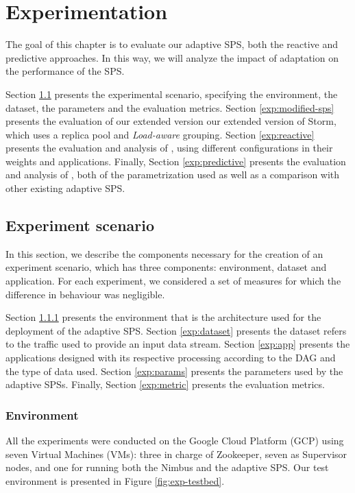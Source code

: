 \chapter{Experimentation}
\label{experimentation}
The goal of this chapter is to evaluate our adaptive SPS, both the reactive and predictive approaches. In this way, we will analyze the impact of adaptation on the performance of the SPS. %

Section \ref{exp:scenario} presents the experimental scenario, specifying the environment, the dataset, the parameters and the evaluation metrics. Section \ref{exp:modified-sps} presents the evaluation of our extended version our extended version of Storm, which uses a replica pool and \textit{Load-aware} grouping. Section \ref{exp:reactive} presents the evaluation and analysis of \rSPS{}, using different configurations in their weights and applications. Finally, Section \ref{exp:predictive} presents the evaluation and analysis of \pSPS{}, both of the parametrization used as well as a comparison with other existing adaptive SPS.

\section{Experiment scenario}
\label{exp:scenario}
In this section, we describe the components necessary for the creation of an experiment scenario, which has three components: environment, dataset and application. For each experiment, we considered a set of measures for which the difference in behaviour was negligible.

Section \ref{exp:enviroment} presents the environment that is the architecture used for the deployment of the adaptive SPS. Section \ref{exp:dataset} presents the dataset refers to the traffic used to provide an input data stream. Section \ref{exp:app} presents the applications designed with its respective processing according to the DAG and the type of data used. Section \ref{exp:params} presents the parameters used by the adaptive SPSs. Finally, Section \ref{exp:metric} presents the evaluation metrics.
 
\subsection{Environment} 
\label{exp:enviroment}
All the experiments were conducted on the Google Cloud Platform (GCP) using seven Virtual Machines (VMs): three in charge of Zookeeper, seven as Supervisor nodes, and one for running both the Nimbus and the adaptive SPS. Our test environment is presented in Figure \ref{fig:exp-testbed}. 


